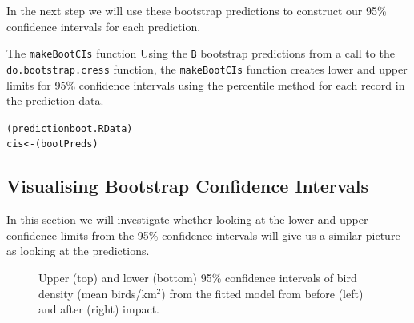 \noindent In the next step we will use these bootstrap predictions to construct our 95\% confidence intervals for each prediction. 

\begin{block}{The {\tt makeBootCIs} function}
Using the {\tt B} bootstrap predictions from a call to the {\tt do.bootstrap.cress} function, the {\tt makeBootCIs} function  creates lower and upper limits for 95\% confidence intervals using the percentile method for each record in the prediction data. \\
\end{block}

\begin{knitrout}\footnotesize
{}\color{fgcolor}\begin{kframe}
\begin{alltt}
(predictionboot.RData)
cis <- (bootPreds)
\end{alltt}
\end{kframe}
\end{knitrout}

\pagebreak
\subsection{Visualising Bootstrap Confidence Intervals}
In this section we will investigate whether looking at the lower and upper confidence limits from the 95\% confidence intervals will give us a similar picture as looking at the predictions. 
\begin{figure}[h]
  \centering
  \hfill
  \caption{Upper (top) and lower (bottom) 95\% confidence intervals of bird density (mean birds/km$^2$) from the fitted model from before (left) and after (right) impact.}
  \label{fig:cis}
\end{figure}

